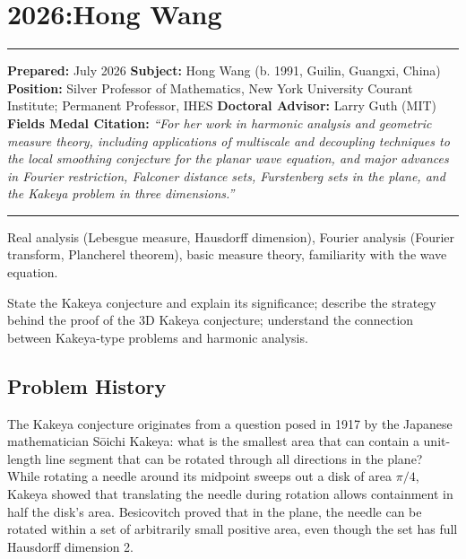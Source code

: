 \chapter{2026:Hong Wang}\label{ch2026hongwang:hong-wang-fields-medal-2026}

\begin{center}\rule{0.5\linewidth}{0.5pt}\end{center}

\textbf{Prepared:} July 2026 \textbf{Subject:} Hong Wang (b. 1991, Guilin, Guangxi, China) \textbf{Position:} Silver Professor of Mathematics, New York University Courant Institute; Permanent Professor, IHES \textbf{Doctoral Advisor:} Larry Guth (MIT) \textbf{Fields Medal Citation:} \emph{``For her work in harmonic analysis and geometric measure theory, including applications of multiscale and decoupling techniques to the local smoothing conjecture for the planar wave equation, and major advances in Fourier restriction, Falconer distance sets, Furstenberg sets in the plane, and the Kakeya problem in three dimensions.''}

\begin{center}\rule{0.5\linewidth}{0.5pt}\end{center}

\begin{prereqs} Real analysis (Lebesgue measure, Hausdorff dimension), Fourier analysis (Fourier transform, Plancherel theorem), basic measure theory, familiarity with the wave equation. \end{prereqs}

\begin{objectives} State the Kakeya conjecture and explain its significance; describe the strategy behind the proof of the 3D Kakeya conjecture; understand the connection between Kakeya-type problems and harmonic analysis. \end{objectives}

\section{Problem History}

The Kakeya conjecture originates from a question posed in 1917 by the Japanese mathematician S\={o}ichi Kakeya: what is the smallest area that can contain a unit-length line segment that can be rotated through all directions in the plane? While rotating a needle around its midpoint sweeps out a disk of area $\pi/4$, Kakeya showed that translating the needle during rotation allows containment in half the disk's area. Besicovitch proved that in the plane, the needle can be rotated within a set of arbitrarily small positive area, even though the set has full Hausdorff dimension 2.

